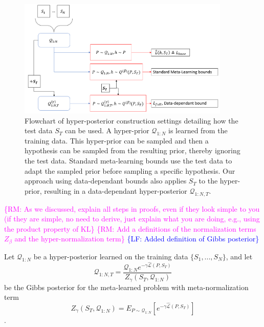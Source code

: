 \documentclass[letterpaper]{article}
\theoremstyle{definition}
\newcommand{\RM}[1]{\textcolor{magenta}{\{RM: #1\}}}
\newcommand{\LF}[1]{\textcolor{blue}{\{LF: #1\}}}
\begin{document}
\begin{figure}
    \centering
    \includegraphics[width=0.9\textwidth]{data_dependant_adaptation.PNG}
    \caption{Flowchart of hyper-posterior construction settings detailing how the test data $S_T$ can be used. A hyper-prior $\mathcal{Q}_{1:N}$ is learned from the training data. This hyper-prior can be sampled and then a hypothesis can be sampled from the resulting prior, thereby ignoring the test data. Standard meta-learning bounds use the test data to adapt the sampled prior before sampling a specific hypothesis. Our approach using data-dependant bounds also applies $S_T$ to the hyper-prior, resulting in a data-dependant hyper-posterior $\mathcal{Q}_{1:N, T}$. }
    \label{fig:data_dependant_bound}
\end{figure}

\RM{As we discussed, explain all steps in proofs, even if they look simple to you (if they are simple, no need to derive, just explain what you are doing, e.g., using the product property of KL}
\RM{Add a definitions of the normalization terms $Z_\beta$ and the hyper-normalization term}
\LF{Added definition of Gibbs posterior}

Let $\mathcal{Q}_{1:N}$ be a hyper-posterior learned on the training data $\{S_1,...,S_N\}$, and let $$\mathcal{Q}_{1:N,T}= \frac{\mathcal{Q}_{1:N}e^{-\gamma\hat{\mathcal{L}}(P,S_T)}}{Z_\gamma(S_T, \mathcal{Q}_{1:N})}$$ be the Gibbs posterior for the meta-learned problem with meta-normalization term $$Z_\gamma(S_T, \mathcal{Q}_{1:N})=E_{P\sim \mathcal{Q}_{1:N}}\left [e^{-\gamma\hat{\mathcal{L}}(P,S_T)} \right ]$$.


\end{document}
